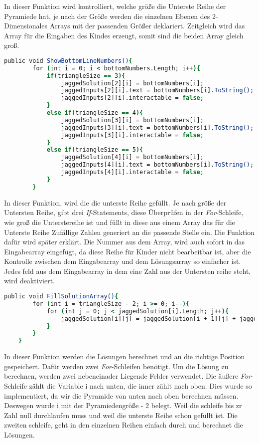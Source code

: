 In dieser Funktion wird kontrolliert, welche größe die Unterste Reihe der Pyramiede hat, je nach der Größe werden die einzelnen Ebenen des 2-Dimensionales Arrays mit der passenden Größer deklariert. Zeitgleich wird das Array für die Eingaben des Kindes erzeugt, somit sind die beiden Array gleich groß.\\
\begin{lstlisting}[language=csh, caption={Triangle.cs ShowBottomLineNumbers-Funktion}]
	public void ShowBottomLineNumbers(){
		for (int i = 0; i < bottomNumbers.Length; i++){
			if(triangleSize == 3){
				jaggedSolution[2][i] = bottomNumbers[i];
				jaggedInputs[2][i].text = bottomNumbers[i].ToString();
				jaggedInputs[2][i].interactable = false;
			}
			else if(triangleSize == 4){
				jaggedSolution[3][i] = bottomNumbers[i];
				jaggedInputs[3][i].text = bottomNumbers[i].ToString();
				jaggedInputs[3][i].interactable = false;
			}
			else if(triangleSize == 5){
				jaggedSolution[4][i] = bottomNumbers[i];
				jaggedInputs[4][i].text = bottomNumbers[i].ToString();
				jaggedInputs[4][i].interactable = false;
			}
		}
\end{lstlisting}
In dieser Funktion, wird die die unterste Reihe gefüllt. Je nach größe der Untersten Reihe, gibt drei \textit{If}-Statements, diese Überprüfen in der \textit{For}-Schleife, wie groß die Unterstereihe ist und füllt in diese aus einem Array das für die Unterste Reihe Zufällige Zahlen generiert an die passende Stelle ein. Die Funktion dafür wird später erklärt. Die Nummer aus dem Array, wird auch sofort in das Eingabearray eingefügt, da diese Reihe für Kinder nicht bearbeitbar ist, aber die Kontrolle zwischen dem Eingabearray und dem Lösungsarray so einfacher ist. Jedes feld aus dem Eingabearray in dem eine Zahl aus der Untersten reihe steht, wird deaktiviert.\\
\begin{lstlisting}[language=csh, caption={Triangle.cs FillSolutionArray-Funktion}]
	public void FillSolutionArray(){
		for (int i = triangleSize - 2; i >= 0; i--){
			for (int j = 0; j < jaggedSolution[i].Length; j++){
				jaggedSolution[i][j] = jaggedSolution[i + 1][j] + jaggedSolution[i + 1][j + 1];
			}
		}
	}
\end{lstlisting}
In dieser Funktion werden die Lösungen berechnet und an die richtige Position gespeichert. Dafür werden zwei \textit{For}-Schleifen benötigt. Um die Lösung zu berechnen, werden zwei nebeneinader Liegende Felder verwendet. Die äußere \textit{For}-Schleife zählt die Variable i nach unten, die inner zählt nach oben. Dies wurde so implementiert, da wir die Pyramide von unten nach oben berechnen müssen. Deswegen wurde i mit der Pyramiedengröße - 2 belegt. Weil die schleife bis zr Zahl null durchlaufen muss und weil die unterste Reihe schon gefüllt ist. Die zweiten schleife, geht in den einzelnen Reihen einfach durch und berechnet die Lösungen.\\
